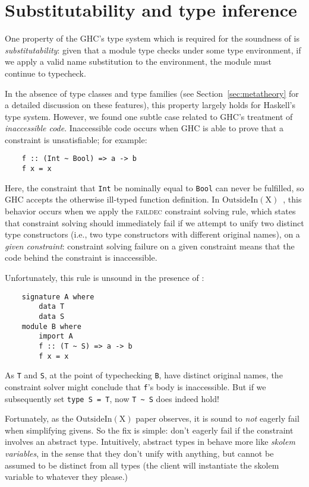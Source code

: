 \section{Substitutability and type inference}
\label{sec:substitutability}

One property of the GHC's type system which is required for
the soundness of \Backpack{} is \emph{substitutability}: given that
a module type checks under some type environment, if we apply a
valid name substitution to the environment, the module must
continue to typecheck.

In the absence of type classes and type families (see
Section~\ref{sec:metatheory} for a detailed discussion on these
features), this property largely holds for Haskell's type system.
However, we found one subtle case related to GHC's treatment
of \emph{inaccessible code}.  Inaccessible code occurs when
GHC is able to prove that a constraint is unsatisfiable; for
example:

\begin{lstlisting}
    f :: (Int ~ Bool) => a -> b
    f x = x
\end{lstlisting}
%
Here, the constraint that \verb|Int| be nominally equal to \verb|Bool|
can never be fulfilled, so GHC accepts the otherwise ill-typed
function definition.  In $\mathrm{OutsideIn(X)}$~\cite{Vytiniotis:2011:OMT:2139531.2139533},
this behavior occurs when we apply the \textsc{faildec} constraint
solving rule, which states that
constraint solving should immediately fail if we attempt to unify
two distinct type constructors (i.e., two type constructors with
different original names), on a \emph{given
constraint}: constraint solving failure on a given constraint means that
the code behind the constraint is inaccessible.

Unfortunately, this rule is unsound in the presence of \Backpack{}:

\begin{lstlisting}
    signature A where
        data T
        data S
    module B where
        import A
        f :: (T ~ S) => a -> b
        f x = x
\end{lstlisting}

As \verb|T| and \verb|S|, at the point of typechecking \verb|B|, have
distinct original names, the constraint solver might conclude that
\verb|f|'s body is inaccessible.  But if we subsequently set
\verb|type S = T|, now \verb|T ~ S| does indeed hold!

Fortunately, as the $\mathrm{OutsideIn(X)}$ paper observes, it is sound
to \emph{not} eagerly fail when simplifying givens.  So the fix is simple:
don't eagerly fail if the constraint involves an abstract type.
Intuitively, abstract types in \Backpack{} behave more like \emph{skolem
variables}, in the sense that they don't unify with anything, but cannot
be assumed to be distinct from all types (the client will instantiate
the skolem variable to whatever they please.)

